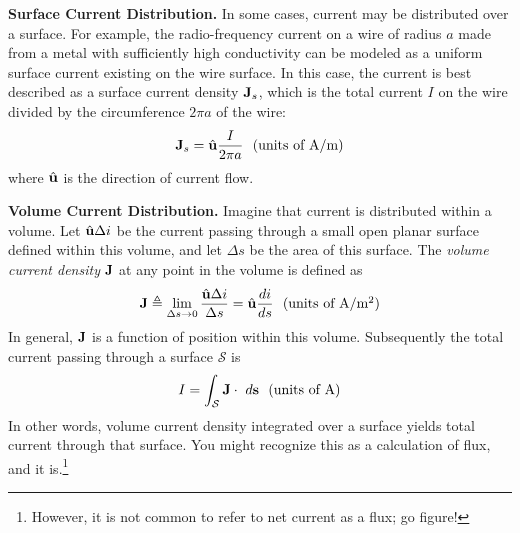{\bf Surface Current Distribution.} 
In some cases, current may be distributed over a surface.
For example, the radio-frequency current on a wire of radius $a$ made from a metal with sufficiently high conductivity can be modeled as a uniform surface current existing on the wire surface.  
In this case, the current is best described as a surface current density ${\bf J}_s$, which is the total current $I$ on the wire divided by the circumference $2\pi a$ of the wire:
%
\begin{equation}
{\bf J}_s = \hat{\bf u}\frac{I}{2\pi a}~~\mbox{(units of A/m)}
\end{equation} 
%
where $\hat{\bf u}$ is the direction of current flow. 

{\bf Volume Current Distribution.} 
Imagine that current is distributed within a volume.   
Let $\hat{\bf u}\Delta i$ be the current passing through a small open planar surface defined within this volume, and let $\Delta s$ be the area of this surface.
The \emph{volume current density} ${\bf J}$ at any point in the volume is defined as
%
\begin{equation}
{\bf J} \triangleq \lim_{\Delta s \to 0} \frac{\hat{\bf u}\Delta i}{\Delta s} = \hat{\bf u}\frac{di}{ds}~~\mbox{(units of A/m$^2$)}
\end{equation}
%
In general, ${\bf J}$ is a function of position within this volume.
Subsequently the total current passing through a surface ${\mathcal S}$ is
%
\begin{equation}
I = \int_{\mathcal S} {\bf J}\cdot~d{\bf s}~~\mbox{(units of A)}
\end{equation}
%
In other words, volume current density integrated over a surface yields total current through that surface.  
You might recognize this as a calculation of flux, 
and it is.\footnote{However, it is not common to refer to net current as a flux; go figure!}


